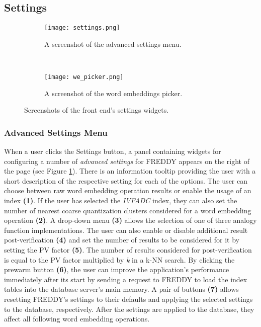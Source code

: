 \subsection{Settings}
\begin{figure}
	\centering
	\begin{subfigure}[t]{0.6\textwidth}
		\centering\texttt{[image: settings.png]}
		\caption{A screenshot of the advanced settings menu.}
		\label{fig:settings_menu}
	\end{subfigure}%
	~
	\begin{subfigure}[t]{0.38\textwidth}
		\centering\texttt{[image: we\_picker.png]}
		\caption{A screenshot of the word embeddings picker.}
		\label{fig:we_picker}
	\end{subfigure}
	\caption{Screenshots of the front end's settings widgets.}
\end{figure}
\subsubsection{Advanced Settings Menu}
When a user clicks the Settings button, a panel containing widgets for configuring a number of \textit{advanced settings} for FREDDY appears on the right of the page (see Figure \ref{fig:settings_menu}). There is an information tooltip providing the user with a short description of the respective setting for each of the options. The user can choose between raw word embedding operation results or enable the usage of an index \textbf{(1)}. If the user has selected the \textit{IVFADC} index, they can also set the number of nearest coarse quantization clusters considered for a word embedding operation \textbf{(2)}. A drop-down menu \textbf{(3)} allows the selection of one of three analogy function implementations. The user can also enable or disable additional result post-verification \textbf{(4)} and set the number of results to be considered for it by setting the PV factor \textbf{(5)}. The number of results considered for post-verification is equal to the PV factor multiplied by \textit{k} in a k-NN search. By clicking the prewarm button \textbf{(6)}, the user can improve the application's performance immediately after its start by sending a request to FREDDY to load the index tables into the database server's main memory. A pair of buttons \textbf{(7)} allows resetting FREDDY's settings to their defaults and applying the selected settings to the database, respectively. After the settings are applied to the database, they affect all following word embedding operations.

